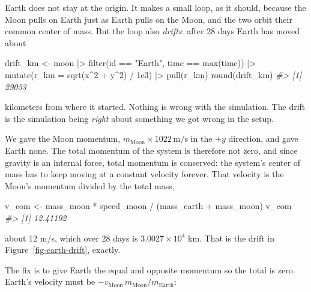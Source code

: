 \documentclass[
  10.5pt,
  letterpaper,
]{scrbook}
\newenvironment{Shaded}{\begin{snugshade}}{\end{snugshade}}
\newcommand{\AttributeTok}[1]{\textcolor[rgb]{0.00,0.00,0.00}{#1}}
\newcommand{\CommentTok}[1]{\textcolor[rgb]{0.00,0.00,0.00}{\textit{#1}}}
\newcommand{\DecValTok}[1]{\textcolor[rgb]{0.00,0.00,0.00}{#1}}
\newcommand{\FloatTok}[1]{\textcolor[rgb]{0.00,0.00,0.00}{#1}}
\newcommand{\FunctionTok}[1]{\textcolor[rgb]{0.00,0.00,0.00}{#1}}
\newcommand{\NormalTok}[1]{\textcolor[rgb]{0.00,0.00,0.00}{#1}}
\newcommand{\OtherTok}[1]{\textcolor[rgb]{0.00,0.00,0.00}{#1}}
\newcommand{\SpecialCharTok}[1]{\textcolor[rgb]{0.00,0.00,0.00}{#1}}
\newcommand{\StringTok}[1]{\textcolor[rgb]{0.00,0.00,0.00}{#1}}
\newcounter{none} %
\theoremstyle{plain}
\theoremstyle{remark}
\begin{document}
Earth does not stay at the origin. It makes a small loop, as it should,
because the Moon pulls on Earth just as Earth pulls on the Moon, and the
two orbit their common center of mass. But the loop also \emph{drifts}:
after 28 days Earth has moved about

\begin{Shaded}
\begin{Highlighting}[]
\NormalTok{drift\_km }\OtherTok{\textless{}{-}}\NormalTok{ moon }\SpecialCharTok{|\textgreater{}}
  \FunctionTok{filter}\NormalTok{(id }\SpecialCharTok{==} \StringTok{"Earth"}\NormalTok{, time }\SpecialCharTok{==} \FunctionTok{max}\NormalTok{(time)) }\SpecialCharTok{|\textgreater{}}
  \FunctionTok{mutate}\NormalTok{(}\AttributeTok{r\_km =} \FunctionTok{sqrt}\NormalTok{(x}\SpecialCharTok{\^{}}\DecValTok{2} \SpecialCharTok{+}\NormalTok{ y}\SpecialCharTok{\^{}}\DecValTok{2}\NormalTok{) }\SpecialCharTok{/} \FloatTok{1e3}\NormalTok{) }\SpecialCharTok{|\textgreater{}}
  \FunctionTok{pull}\NormalTok{(r\_km)}
\FunctionTok{round}\NormalTok{(drift\_km)}
\CommentTok{\#\textgreater{} [1] 29053}
\end{Highlighting}
\end{Shaded}

kilometers from where it started. Nothing is wrong with the simulation.
The drift is the simulation being \emph{right} about something we got
wrong in the setup.

We gave the Moon momentum,
\(m_{\mathrm{Moon}} \times 1022\ \mathrm{m/s}\) in the \(+y\) direction,
and gave Earth none. The total momentum of the system is therefore not
zero, and since gravity is an internal force, total momentum is
conserved: the system's center of mass has to keep moving at a constant
velocity forever. That velocity is the Moon's momentum divided by the
total mass,

\begin{Shaded}
\begin{Highlighting}[]
\NormalTok{v\_com }\OtherTok{\textless{}{-}}\NormalTok{ mass\_moon }\SpecialCharTok{*}\NormalTok{ speed\_moon }\SpecialCharTok{/}\NormalTok{ (mass\_earth }\SpecialCharTok{+}\NormalTok{ mass\_moon)}
\NormalTok{v\_com}
\CommentTok{\#\textgreater{} [1] 12.41192}
\end{Highlighting}
\end{Shaded}

about 12 m/s, which over 28 days is \ensuremath{3.0027\times 10^{4}} km.
That is the drift in Figure~\ref{fig-earth-drift}, exactly.

The fix is to give Earth the equal and opposite momentum so the total is
zero. Earth's velocity must be
\(-v_{\mathrm{Moon}}\, m_{\mathrm{Moon}}/m_{\mathrm{Earth}}\):
\end{document}
